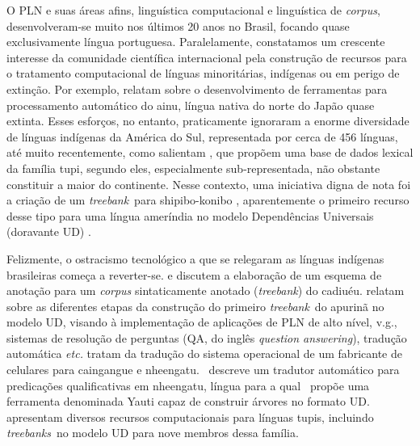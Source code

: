 \documentclass[portuguese]{textolivre}
\newcommand{\tbs}{\textit{treebanks}}
\newcommand{\tb}{\textit{treebank}}
\newcommand{\vtres}{\textcite{alencar2023-yauti}}
\newcommand{\vum}{\textcite{alencar2021}}
\begin{document}
O PLN e suas áreas afins, linguística computacional e linguística de \textit{corpus}, desenvolveram-se muito nos últimos 20 anos no Brasil, focando quase exclusivamente língua portuguesa. Paralelamente, constatamos um crescente interesse da comunidade científica internacional pela construção de recursos para o tratamento computacional de línguas minoritárias, indígenas ou em perigo de extinção. Por exemplo, \textcite{ainu-2013nlp} relatam sobre o desenvolvimento de ferramentas para processamento automático do ainu, língua nativa do norte do Japão quase extinta. Esses esforços, no entanto, praticamente ignoraram a enorme diversidade de línguas indígenas da América do Sul, representada por cerca de 456 línguas, até muito recentemente, como salientam \textcite{Gerardi2021}, que propõem uma base de dados lexical da família tupi, segundo eles, especialmente sub-representada, não obstante constituir a maior do continente. Nesse contexto, uma iniciativa digna de nota foi a criação de um \tb~para shipibo-konibo \parencite{vasquez-etal-2018-toward-k}, aparentemente o primeiro recurso desse tipo para uma língua ameríndia no modelo Dependências Universais (doravante UD) \parencite{nivre-etal-2016-universal-k,de-marneffe-etal-2021-universal-k}. 

Felizmente, o ostracismo tecnológico a que se relegaram as línguas indígenas brasileiras começa a reverter-se. \textcite{Galves2017} e \textcite{sandalo2023anotando} discutem a elaboração de um esquema de anotação para um \textit{corpus} sintaticamente anotado (\tb) do cadiuéu. \textcite{rueter-etal-2021-apurina-k} relatam sobre as diferentes etapas da construção do primeiro \tb~do apurinã no modelo UD, visando à implementação de aplicações de PLN de alto nível, v.g., sistemas de resolução de perguntas (QA, do inglês \textit{question answering}), tradução automática \textit{etc.} \textcite{DAngelis-2021} tratam da tradução do sistema operacional de um fabricante de celulares para caingangue e nheengatu. \vum~descreve um tradutor automático para predicações qualificativas em nheengatu, língua para a qual \vtres~propõe uma ferramenta denominada Yauti capaz de construir árvores no formato UD. \textcite{martin-rodriguez-etal-2022-tupian-k,santos2024linguas} apresentam diversos recursos computacionais para línguas tupis, incluindo \tbs~no modelo UD para nove membros dessa família.
\end{document}
